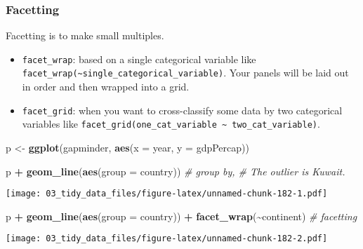 \documentclass[
]{book}
\newenvironment{Shaded}{\begin{snugshade}}{\end{snugshade}}
\newcommand{\CommentTok}[1]{\textcolor[rgb]{0.56,0.35,0.01}{\textit{#1}}}
\newcommand{\DataTypeTok}[1]{\textcolor[rgb]{0.13,0.29,0.53}{#1}}
\newcommand{\KeywordTok}[1]{\textcolor[rgb]{0.13,0.29,0.53}{\textbf{#1}}}
\newcommand{\NormalTok}[1]{#1}
\newcommand{\OperatorTok}[1]{\textcolor[rgb]{0.81,0.36,0.00}{\textbf{#1}}}
\newcommand{\StringTok}[1]{\textcolor[rgb]{0.31,0.60,0.02}{#1}}
\begin{document}
\hypertarget{facetting}{%
\subsubsection{Facetting}\label{facetting}}

Facetting is to make small multiples.

\begin{itemize}
\item
  \texttt{facet\_wrap}: based on a single categorical variable like \texttt{facet\_wrap(\textasciitilde{}single\_categorical\_variable)}. Your panels will be laid out in order and then wrapped into a grid.
\item
  \texttt{facet\_grid}: when you want to cross-classify some data by two categorical variables like \texttt{facet\_grid(one\_cat\_variable\ \textasciitilde{}\ two\_cat\_variable)}.
\end{itemize}

\begin{Shaded}
\begin{Highlighting}[]
\NormalTok{p \textless{}{-}}\StringTok{ }\KeywordTok{ggplot}\NormalTok{(gapminder, }\KeywordTok{aes}\NormalTok{(}\DataTypeTok{x =}\NormalTok{ year, }\DataTypeTok{y =}\NormalTok{ gdpPercap))}

\NormalTok{p }\OperatorTok{+}\StringTok{ }\KeywordTok{geom\_line}\NormalTok{(}\KeywordTok{aes}\NormalTok{(}\DataTypeTok{group =}\NormalTok{ country)) }\CommentTok{\# group by, \# The outlier is Kuwait.}
\end{Highlighting}
\end{Shaded}

\texttt{[image: 03\_tidy\_data\_files/figure-latex/unnamed-chunk-182-1.pdf]}

\begin{Shaded}
\begin{Highlighting}[]
\NormalTok{p }\OperatorTok{+}\StringTok{ }\KeywordTok{geom\_line}\NormalTok{(}\KeywordTok{aes}\NormalTok{(}\DataTypeTok{group =}\NormalTok{ country)) }\OperatorTok{+}\StringTok{ }\KeywordTok{facet\_wrap}\NormalTok{(}\OperatorTok{\textasciitilde{}}\NormalTok{continent) }\CommentTok{\# facetting}
\end{Highlighting}
\end{Shaded}

\texttt{[image: 03\_tidy\_data\_files/figure-latex/unnamed-chunk-182-2.pdf]}
\end{document}
